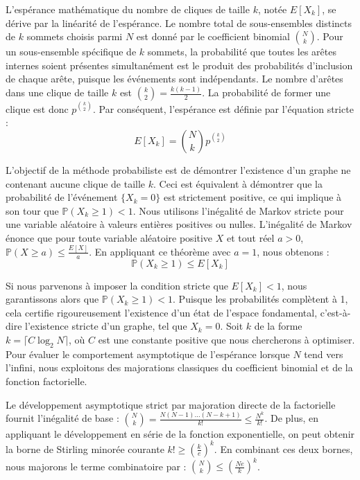 \documentclass[11pt, a4paper]{article}
\begin{document}
L'espérance mathématique du nombre de cliques de taille $k$, notée $E[X_k]$, se dérive par la linéarité de l'espérance.
Le nombre total de sous-ensembles distincts de $k$ sommets choisis parmi $N$ est donné par le coefficient binomial $\binom{N}{k}$.
Pour un sous-ensemble spécifique de $k$ sommets, la probabilité que toutes les arêtes internes soient présentes simultanément est le produit des probabilités d'inclusion de chaque arête, puisque les événements sont indépendants.
Le nombre d'arêtes dans une clique de taille $k$ est $\binom{k}{2} = \frac{k(k-1)}{2}$.
La probabilité de former une clique est donc $p^{\binom{k}{2}}$.
Par conséquent, l'espérance est définie par l'équation stricte :
$$E[X_k] = \binom{N}{k} p^{\binom{k}{2}}$$

L'objectif de la méthode probabiliste est de démontrer l'existence d'un graphe ne contenant aucune clique de taille $k$. Ceci est équivalent à démontrer que la probabilité de l'événement $\{X_k = 0\}$ est strictement positive, ce qui implique à son tour que $\mathbb{P}(X_k \ge 1) < 1$.
Nous utilisons l'inégalité de Markov stricte pour une variable aléatoire à valeurs entières positives ou nulles.
L'inégalité de Markov énonce que pour toute variable aléatoire positive $X$ et tout réel $a > 0$, $\mathbb{P}(X \ge a) \le \frac{E[X]}{a}$.
En appliquant ce théorème avec $a = 1$, nous obtenons :
$$\mathbb{P}(X_k \ge 1) \le E[X_k]$$

Si nous parvenons à imposer la condition stricte que $E[X_k] < 1$, nous garantissons alors que $\mathbb{P}(X_k \ge 1) < 1$. Puisque les probabilités complètent à 1, cela certifie rigoureusement l'existence d'un état de l'espace fondamental, c'est-à-dire l'existence stricte d'un graphe, tel que $X_k = 0$.
Soit $k$ de la forme $k = \lceil C \log_2 N \rceil$, où $C$ est une constante positive que nous chercherons à optimiser.
Pour évaluer le comportement asymptotique de l'espérance lorsque $N$ tend vers l'infini, nous exploitons des majorations classiques du coefficient binomial et de la fonction factorielle.

Le développement asymptotique strict par majoration directe de la factorielle fournit l'inégalité de base :
$\binom{N}{k} = \frac{N(N-1)\dots(N-k+1)}{k!} \le \frac{N^k}{k!}$.
De plus, en appliquant le développement en série de la fonction exponentielle, on peut obtenir la borne de Stirling minorée courante $k! \ge \left(\frac{k}{e}\right)^k$.
En combinant ces deux bornes, nous majorons le terme combinatoire par :
$\binom{N}{k} \le \left(\frac{Ne}{k}\right)^k$.
\end{document}
